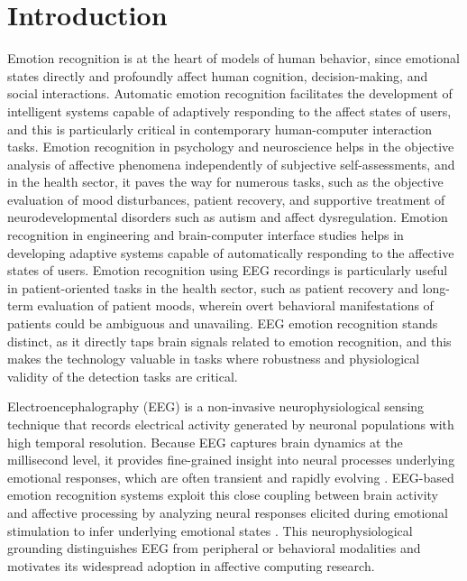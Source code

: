 \documentclass{WileyMSP-template}
\begin{document}
\section{Introduction}
Emotion recognition is at the heart of models of human behavior, since emotional states directly and profoundly affect human cognition, decision-making, and social interactions. Automatic emotion recognition facilitates the development of intelligent systems capable of adaptively responding to the affect states of users, and this is particularly critical in contemporary human-computer interaction tasks. Emotion recognition in psychology and neuroscience helps in the objective analysis of affective phenomena independently of subjective self-assessments, and in the health sector, it paves the way for numerous tasks, such as the objective evaluation of mood disturbances, patient recovery, and supportive treatment of neurodevelopmental disorders such as autism and affect dysregulation. Emotion recognition in engineering and brain-computer interface studies helps in developing adaptive systems capable of automatically responding to the affective states of users. Emotion recognition using EEG recordings is particularly useful in patient-oriented tasks in the health sector, such as patient recovery and long-term evaluation of patient moods, wherein overt behavioral manifestations of patients could be ambiguous and unavailing. EEG emotion recognition stands distinct, as it directly taps brain signals related to emotion recognition, and this makes the technology valuable in tasks where robustness and physiological validity of the detection tasks are critical.

Electroencephalography (EEG) is a non-invasive neurophysiological sensing technique that records electrical activity generated by neuronal populations with high temporal resolution. Because EEG captures brain dynamics at the millisecond level, it provides fine-grained insight into neural processes underlying emotional responses, which are often transient and rapidly evolving \cite{zheng2015eeg,koelstra2012deap}. EEG-based emotion recognition systems exploit this close coupling between brain activity and affective processing by analyzing neural responses elicited during emotional stimulation to infer underlying emotional states \cite{lin2010eegemotion}. This neurophysiological grounding distinguishes EEG from peripheral or behavioral modalities and motivates its widespread adoption in affective computing research.
\end{document}
